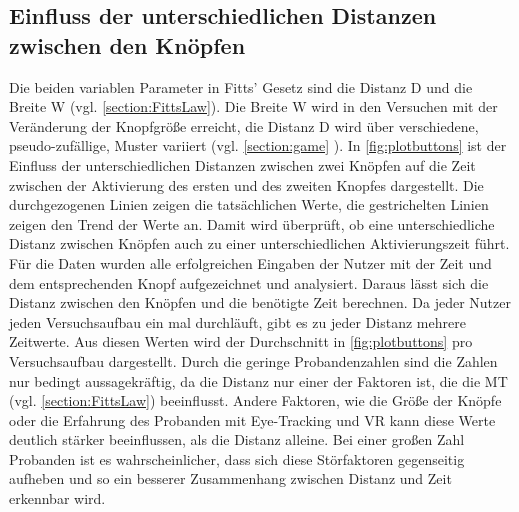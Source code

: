 \subsection{Einfluss der unterschiedlichen Distanzen zwischen den Knöpfen}
Die beiden variablen Parameter in Fitts' Gesetz sind die Distanz D und die Breite W (vgl. \autoref{section:FittsLaw}). Die Breite W wird in den Versuchen mit der Veränderung der Knopfgröße erreicht, die Distanz D wird über verschiedene, pseudo-zufällige, Muster variiert (vgl. \autoref{section:game} ). In \autoref{fig:plotbuttons} ist der Einfluss der unterschiedlichen Distanzen zwischen zwei Knöpfen auf die Zeit zwischen der Aktivierung des ersten und des zweiten Knopfes dargestellt. Die durchgezogenen Linien zeigen die tatsächlichen Werte, die gestrichelten Linien zeigen den Trend der Werte an. Damit wird überprüft, ob eine unterschiedliche Distanz zwischen Knöpfen auch zu einer unterschiedlichen Aktivierungszeit führt. Für die Daten wurden alle erfolgreichen Eingaben der Nutzer mit der Zeit und dem entsprechenden Knopf aufgezeichnet und analysiert. Daraus lässt sich die Distanz zwischen den Knöpfen und die benötigte Zeit berechnen. Da jeder Nutzer jeden Versuchsaufbau ein mal durchläuft, gibt es zu jeder Distanz mehrere Zeitwerte. Aus diesen Werten wird der Durchschnitt in \autoref{fig:plotbuttons} pro Versuchsaufbau dargestellt. Durch die geringe Probandenzahlen sind die Zahlen nur bedingt aussagekräftig, da die Distanz nur einer der Faktoren ist, die die \ac{MT} (vgl. \autoref{section:FittsLaw}) beeinflusst. Andere Faktoren, wie die Größe der Knöpfe oder die Erfahrung des Probanden mit Eye-Tracking und VR kann diese Werte deutlich stärker beeinflussen, als die Distanz alleine. Bei einer großen Zahl Probanden ist es wahrscheinlicher, dass sich diese Störfaktoren gegenseitig aufheben und so ein besserer Zusammenhang zwischen Distanz und Zeit erkennbar wird. 
